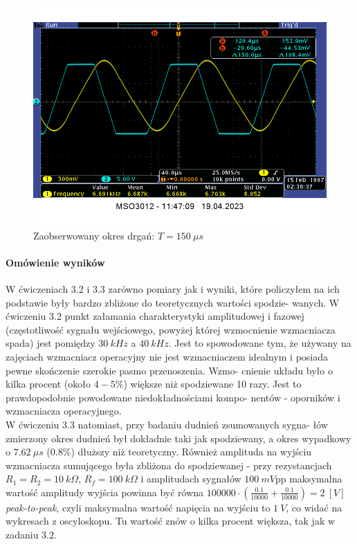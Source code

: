 \documentclass[14pt, table]{extarticle}
\begin{document}
\begin{figure}[H]
\includegraphics[scale=0.8]{A33}
\centering
\captionsetup{labelformat=empty}
\caption{Zaobserwowany okres drgań: $T = 150 \ \mu s$}
\end{figure}

\newpage
\paragraph{Omówienie wyników \\}
W ćwiczeniach 3.2 i 3.3 zarówno pomiary jak i wyniki, które policzyłem na ich podstawie były bardzo zbliżone do teoretycznych wartości spodzie- wanych. W ćwiczeniu 3.2 punkt załamania charakterystyki amplitudowej i fazowej (częstotliwość sygnału wejściowego, powyżej której wzmocnienie wzmacniacza spada) jest pomiędzy $30 \ kHz$ a $40 \ kHz$. Jest to spowodowane tym, że używany na zajęciach wzmacniacz operacyjny nie jest wzmacniaczem idealnym i posiada pewne skończenie szerokie pasmo przenoszenia. Wzmo- cnienie układu było o kilka procent (około $4 - 5 \%$) większe niż spodziewane 10 razy. Jest to prawdopodobnie powodowane niedokładnościami kompo- nentów - oporników i wzmacniacza operacyjnego. \\

W ćwiczeniu 3.3 natomiast, przy badaniu dudnień zsumowanych sygna- łów zmierzony okres dudnień był dokładnie taki jak spodziewany, a okres wypadkowy o $7.62 \ \mu s$ ($0.8 \%$) dłuższy niż teoretyczny. Również amplituda na wyjściu wzmacniacza sumującego była zbliżona do spodziewanej - przy rezystancjach $R_1 = R_2 = 10 \ k \Omega$, $R_f = 100 \ k \Omega$ i amplitudach sygnałów $100 \ mV$pp maksymalna wartość amplitudy wyjścia powinna być równa $100000 \cdot \left( \frac{0.1}{10000} + \frac{0.1}{10000} \right) = 2 \ \left[ V \right]$ \textit{peak-to-peak}, czyli maksymalna wartość napięcia na wyjściu to $1 \ V$, co widać na wykresach z oscyloskopu. Tu wartość znów o kilka procent większa, tak jak w zadaniu 3.2. \\
\end{document}
